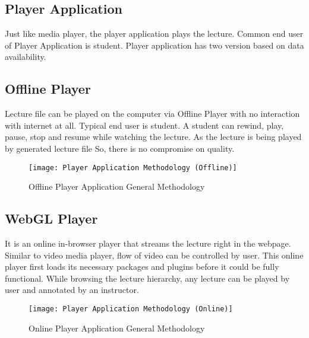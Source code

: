 \newpage

\subsection{Player Application}
Just like media player, the player application plays the lecture. Common end user of Player Application is student. Player application has two version based on data availability.

\subsection{Offline Player}
Lecture file can be played on the computer via Offline Player with no interaction with internet at all. Typical end user is student. A student can rewind, play, pause, stop and resume while watching the lecture. As the lecture is being played by generated lecture file So, there is no compromise on quality.
\begin{figure}[h]
  \centering
  \texttt{[image: Player Application Methodology (Offline)]}
  \caption{Offline Player Application General Methodology}
\end{figure}

\subsection{WebGL Player}
It is an online in-browser player that streams the lecture right in the webpage. Similar to video media player, flow of video can be controlled by user. This online player first loads its necessary packages and plugins before it could be fully functional. While browsing the lecture hierarchy, any lecture can be played by user and annotated by an instructor.

\begin{figure}[h]
  \centering
  \texttt{[image: Player Application Methodology (Online)]}
  \caption{Online Player Application General Methodology}
\end{figure}

\newpage
